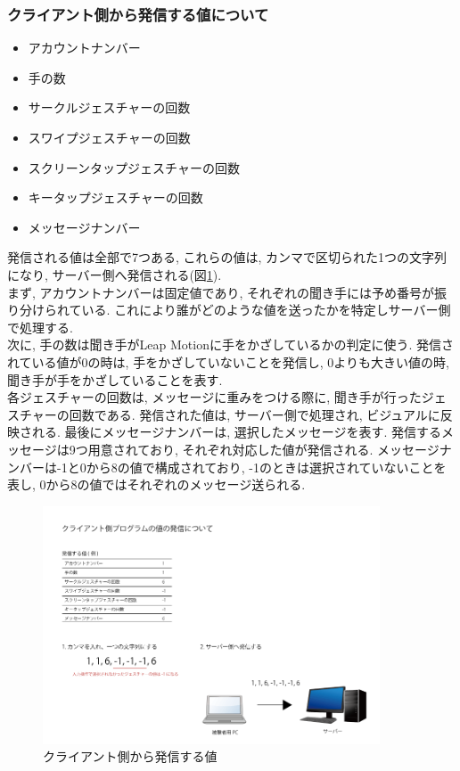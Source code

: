 \documentclass{funthesis}
\begin{document}

\subsubsection{クライアント側から発信する値について}

\begin{itemize}
 \item アカウントナンバー
 \item 手の数
 \item サークルジェスチャーの回数
 \item スワイプジェスチャーの回数
  \item スクリーンタップジェスチャーの回数
 \item キータップジェスチャーの回数
 \item  メッセージナンバー
\end{itemize}

発信される値は全部で7つある, これらの値は, カンマで区切られた1つの文字列になり, サーバー側へ発信される(図\ref{send}).\\ 
まず, アカウントナンバーは固定値であり, それぞれの聞き手には予め番号が振り分けられている. これにより誰がどのような値を送ったかを特定しサーバー側で処理する. \\
次に, 手の数は聞き手がLeap Motionに手をかざしているかの判定に使う. 発信されている値が0の時は, 手をかざしていないことを発信し, 0よりも大きい値の時, 聞き手が手をかざしていることを表す. \\
各ジェスチャーの回数は, メッセージに重みをつける際に, 聞き手が行ったジェスチャーの回数である. 発信された値は, サーバー側で処理され, ビジュアルに反映される. 
最後にメッセージナンバーは, 選択したメッセージを表す. 発信するメッセージは9つ用意されており, それぞれ対応した値が発信される. メッセージナンバーは-1と0から8の値で構成されており, -1のときは選択されていないことを表し, 0から8の値ではそれぞれのメッセージ送られる. \\


\begin{figure}[H]
 \begin{center}
  \includegraphics[width=100mm]{./img/sendCL.png}
 \end{center}
 \caption{クライアント側から発信する値}
 \label{send}
\end{figure}
\end{document}
